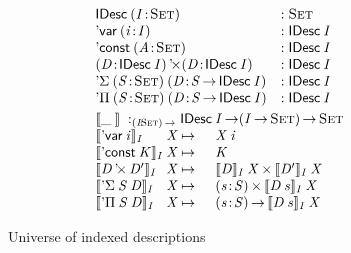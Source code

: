 
\begin{figure}

\[\stk{\begin{array}{@{}ll}
\IDesc{(\Bhab{\M{I}}{\Set})} &: \Set \\
\DVar{(\Bhab{\M{i}}{\M{I}})} &: \IDesc{\M{I}} \\
\DConst{(\Bhab{\M{A}}{\Set})} &:\IDesc{\M{I}}       \\
\DProd{(\Bhab{\M{D}}{\IDesc{\M{I}}})}{(\Bhab{\M{D}}{\IDesc{\M{I}}})}
  & :\IDesc{\M{I}}       \\
\DSigma{(\Bhab{\M{S}}{\Set})}{(\Bhab{\M{D}}{\M{S}\To\IDesc{\M{I}}})}
& : \IDesc{\M{I}}  \\
\DPi{(\Bhab{\M{S}}{\Set})}{(\Bhab{\M{D}}{\M{S}\To\IDesc{\M{I}}})}
& : \IDesc{\M{I}}  \\
\end{array}\smallskip \\
\idescop{\_\:}{}{} :_{\PI{\V{I}}{\Set}} \IDesc{\V{I}} \To (\V{\V{I}} \To \Set) \To \Set                  \\
\begin{array}{@{}l@{\V{X}}@{\:\mapsto\:\:}ll}
\idescop{\DVar{\V{i}}}{\V{I}}{&}      &  \V{X}\: \V{i}                                           \\
\idescop{\DConst{\V{K}}}{\V{I}}{&}    &  \V{K}                                                   \\
\idescop{\DProd{\V{D}}{\V{D'}}}{\V{I}}{&} &  \TIMES{\idescop{\V{D}}{\V{I}}{\V{X}}}{\idescop{\V{D'}}{\V{I}}{\V{X}}}       \\
\idescop{\DSigma{\V{S}}{\V{D}}}{\V{I}}{&} &  \SIGMA{\V{s}}{\V{S}} \idescop{\V{D}\: \V{s}}{\V{I}}{\V{X}}                    \\
\idescop{\DPi{\V{S}}{\V{D}}}{\V{I}}{&}    &  \PI{\V{s}}{\V{S}} \idescop{\V{D}\: \V{s}}{\V{I}}{\V{X}}            
\end{array}
}
\]

\caption{Universe of indexed descriptions}
\label{fig:idesc}

\end{figure}


